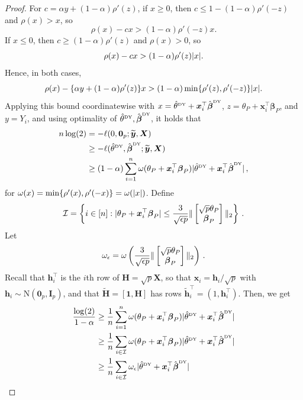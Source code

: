 \documentclass{article}
\makeatletter
\theoremstyle{definition}
\newcommand{\vnorm}[1]{%
	\ensuremath{%
		\if@display
		\left\| #1 \right\|
		\else
		\| #1 \|
		\fi
	}%
}
\newcommand{\abs}[1]{%
	\ensuremath{%
		\if@display
		\left| #1 \right|
		\else
		\lvert #1 \rvert
		\fi
	}%
}
\newcommand*{\bb}{\boldsymbol}
\newcommand{\betady}{\ensuremath{\hat{\bbeta}^{\textrm{\tiny DY}}}}
\newcommand{\thetady}{\ensuremath{\hat{\theta}^{\textrm{\tiny DY}}}}
\def\bH {\bb{H}}
\def\bX{\bb{X}}
\def\bx{\bb{x}}
\def\bh{\bb{h}}
\def\bYtil{\widetilde{\bb{y}}}
\def\bbeta{\bb{\beta}}
\def\bH{\bb{H}}
\makeatother
\begin{document}
\begin{bibunit}
\begin{proof}
For
$c=\alpha y+(1-\alpha)\rho'(z)$, if $x\geq0$, then
$c\leq1-(1-\alpha)\rho'(-z)$ and $\rho(x)>x$, so
\[
    \rho(x)-cx
    >
    (1-\alpha)\rho'(-z)x.
\]
If $x\leq0$, then $c\geq(1-\alpha)\rho'(z)$ and
$\rho(x)>0$, so
\[
    \rho(x)-cx
    >
    (1-\alpha)\rho'(z)\abs{x}.
\]
Hence, in both cases,
\[
    \rho(x)
    -
    \{\alpha y+(1-\alpha)\rho'(z)\}x
    >
    (1-\alpha)
    \min\{\rho'(z),\rho'(-z)\}
    \abs{x}.
\]
Applying this bound coordinatewise with
$x=\thetady+\bx_i^\top\betady$,
$z=\theta_P+\bx_i^\top\bbeta_P$, and $y=Y_i$, and using optimality of
$\thetady,\betady$, it holds that
	$$
	\begin{aligned}
		n \log(2) &=-\ell(0, \bb 0_p; \bYtil, \bX) \\
		& \geq -\ell(\thetady, \betady; \bYtil, \bX) \\
		& \geq (1- \alpha)\sum_{i = 1}^{n} \omega(\theta_P + \bx_i^\top \bbeta_P) \abs{\thetady + \bx_i^\top \betady} \,,
	\end{aligned}
	$$
	for $\omega(x) = \min\{\rho'(x), \rho'(-x) \} = \omega(\abs{x})$.
	Define
	$$
	\mathcal{I} = \left\{i \in [n]: \abs{\theta_P + \bx_i^\top \bbeta_P} \leq \frac{3}{\sqrt{\epsilon p }} \vnorm{\begin{bmatrix}\sqrt{p} \theta_P \\ \bbeta_P \end{bmatrix}}_2 \right\} \,.
	$$
	Let
	$$
	\omega_\epsilon = \omega\left( \frac{3}{\sqrt{\epsilon p }} \vnorm{\begin{bmatrix}\sqrt{p} \theta_P \\ \bbeta_P \end{bmatrix}}_2\right) \,.
	$$
	Recall that $\bh_i^\top$ is the $i$th row of $\bH=\sqrt p\bX$, so that $\bx_i=\bh_i/\sqrt p$ with $\bh_i\sim\mathrm N(\bb0_p,\bb I_p)$, and that $\widetilde{\bH}=[\bb1,\bH]$ has rows $\widetilde{\bh}_i^\top=(1,\bh_i^\top)$. Then, we get
	\begin{equation}
	\label{eq:bound_chain}
	\begin{aligned}
		\frac{\log(2)}{1 - \alpha} & \geq \frac{1}{n}\sum_{i = 1}^{n} \omega(\theta_P + \bx_i^\top \bbeta_P) \abs{ \thetady + \bx_i^\top \betady }  \\
		&\geq \frac{1}{n} \sum_{i \in \mathcal{I}} \omega(\theta_P + \bx_i^\top \bbeta_P) \abs{ \thetady + \bx_i^\top \betady }  \\
		&\geq  \frac{1}{n} \sum_{i \in \mathcal I} \omega_\epsilon \abs{ \thetady + \bx_i^\top \betady } \\

\end{aligned}
\end{equation}
\end{proof}
\end{bibunit}
\end{document}
